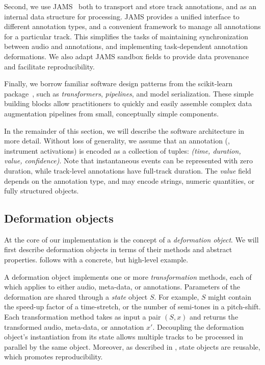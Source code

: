 \documentclass{article}
\begin{document}
Second, we use JAMS~\cite{humphreyjams} both to transport and store track annotations, 
and as an internal data structure for processing.
JAMS provides a unified interface to different annotation types, and a convenient framework to 
manage all annotations for a particular track.
This simplifies the tasks of maintaining synchronization between audio and annotations,
and implementing task-dependent annotation deformations.  
We also adapt JAMS sandbox fields to provide data provenance and facilitate reproducibility.

%
Finally, we borrow familiar software design patterns from the scikit-learn
package~\cite{buitinck2013api}, such as \emph{transformers}, \emph{pipelines}, 
and model serialization.  These simple building blocks allow
practitioners to quickly and easily assemble complex data augmentation pipelines 
from small, conceptually simple components.


In the remainder of this section, we will describe the software architecture in more
detail.
Without loss of generality, we assume that an annotation (\eg, instrument activations) is encoded as a collection of tuples: \emph{(time, duration, value, confidence)}.
Note that instantaneous events can be represented with zero duration, while
track-level annotations have full-track duration.  The \emph{value} field depends on
the annotation type, and may encode strings, numeric quantities, or fully structured
objects.

\subsection{Deformation objects}

At the core of our implementation is the concept of a \emph{deformation object}.
We will first describe deformation objects in terms of their methods and abstract
properties.   follows with a concrete, but high-level example.

A deformation object implements one or more \emph{transformation} methods, each of which
applies to either audio, meta-data, or annotations.
Parameters of the deformation are shared through a \emph{state} object $S$.
For example, $S$ might contain the speed-up factor of a
time-stretch, or the number of semi-tones in a pitch-shift.  
Each transformation method takes as input a pair $(S, x)$ and
returns the transformed audio, meta-data, or annotation $x'$.
Decoupling the deformation object's instantiation from
its state allows multiple tracks to be processed in parallel by the same object.
Moreover, as described in , 
state objects are reusable, which promotes reproducibility.
\end{document}
